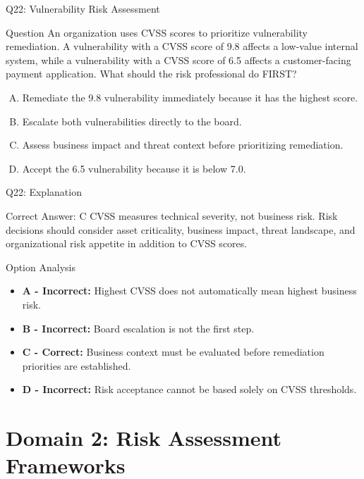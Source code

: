 \documentclass{beamer}
\begin{document}
	\begin{frame}{Q22: Vulnerability Risk Assessment} \begin{block}{Question} An organization uses CVSS scores to prioritize vulnerability remediation. A vulnerability with a CVSS score of 9.8 affects a low-value internal system, while a vulnerability with a CVSS score of 6.5 affects a customer-facing payment application. What should the risk professional do FIRST? \end{block} \begin{enumerate}[(A)] \item Remediate the 9.8 vulnerability immediately because it has the highest score. \item Escalate both vulnerabilities directly to the board. \item Assess business impact and threat context before prioritizing remediation. \item Accept the 6.5 vulnerability because it is below 7.0. \end{enumerate} \end{frame} \begin{frame}{Q22: Explanation} \begin{block}{Correct Answer: C} CVSS measures technical severity, not business risk. Risk decisions should consider asset criticality, business impact, threat landscape, and organizational risk appetite in addition to CVSS scores. \end{block} \begin{block}{Option Analysis} \begin{itemize} \item \textbf{A - Incorrect:} Highest CVSS does not automatically mean highest business risk. \item \textbf{B - Incorrect:} Board escalation is not the first step. \item \textbf{C - Correct:} Business context must be evaluated before remediation priorities are established. \item \textbf{D - Incorrect:} Risk acceptance cannot be based solely on CVSS thresholds. \end{itemize} \end{block} \end{frame}
	
	
	\section{Domain 2: Risk Assessment Frameworks}
	
\end{document}
